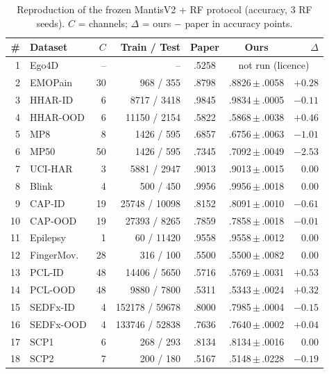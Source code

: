 \documentclass[conference]{IEEEtran}
\begin{document}
\begin{table}[t]
\caption{Kaggle notebooks we ran, with wall-clock time (including downloads).}
\label{tab:sessions}
\centering
\footnotesize
\setlength{\tabcolsep}{3pt}

\end{table}

\begin{table}[t]
\caption{Reproduction of the frozen MantisV2 + RF protocol (accuracy, 3 RF seeds). $C$ = channels; $\Delta$ = ours
$-$ paper in accuracy points.}
\label{tab:repro}
\centering
\footnotesize
\setlength{\tabcolsep}{3pt}
\begin{tabular}{rlrrccr}
\toprule
\# & Dataset & $C$ & Train / Test & Paper & Ours & $\Delta$ \\
\midrule
1 & Ego4D & -- & -- & .5258 & \multicolumn{2}{c}{not run (licence)} \\
2 & EMOPain & 30 & 968 / 355 & .8798 & .8826\,$\pm$\,.0058 & $+0.28$ \\
3 & HHAR-ID & 6 & 8717 / 3418 & .9845 & .9834\,$\pm$\,.0005 & $-0.11$ \\
4 & HHAR-OOD & 6 & 11150 / 2154 & .5822 & .5868\,$\pm$\,.0038 & $+0.46$ \\
5 & MP8 & 8 & 1426 / 595 & .6857 & .6756\,$\pm$\,.0063 & $\mathbf{-1.01}$ \\
6 & MP50 & 50 & 1426 / 595 & .7345 & .7092\,$\pm$\,.0049 & $\mathbf{-2.53}$ \\
7 & UCI-HAR & 3 & 5881 / 2947 & .9013 & .9013\,$\pm$\,.0015 & $0.00$ \\
8 & Blink & 4 & 500 / 450 & .9956 & .9956\,$\pm$\,.0018 & $0.00$ \\
9 & CAP-ID & 19 & 25748 / 10098 & .8152 & .8091\,$\pm$\,.0010 & $-0.61$ \\
10 & CAP-OOD & 19 & 27393 / 8265 & .7859 & .7858\,$\pm$\,.0018 & $-0.01$ \\
11 & Epilepsy & 1 & 60 / 11420 & .9558 & .9558\,$\pm$\,.0012 & $0.00$ \\
12 & FingerMov. & 28 & 316 / 100 & .5500 & .5500\,$\pm$\,.0082 & $0.00$ \\
13 & PCL-ID & 48 & 14406 / 5650 & .5716 & .5769\,$\pm$\,.0031 & $+0.53$ \\
14 & PCL-OOD & 48 & 9880 / 7800 & .5311 & .5343\,$\pm$\,.0024 & $+0.32$ \\
15 & SEDFx-ID & 4 & 152178 / 59678 & .8000 & .7985\,$\pm$\,.0004 & $-0.15$ \\
16 & SEDFx-OOD & 4 & 133746 / 52838 & .7636 & .7640\,$\pm$\,.0002 & $+0.04$ \\
17 & SCP1 & 6 & 268 / 293 & .8134 & .8134\,$\pm$\,.0016 & $0.00$ \\
18 & SCP2 & 7 & 200 / 180 & .5167 & .5148\,$\pm$\,.0228 & $-0.19$ \\
\bottomrule
\end{tabular}
\end{table}
\end{document}
